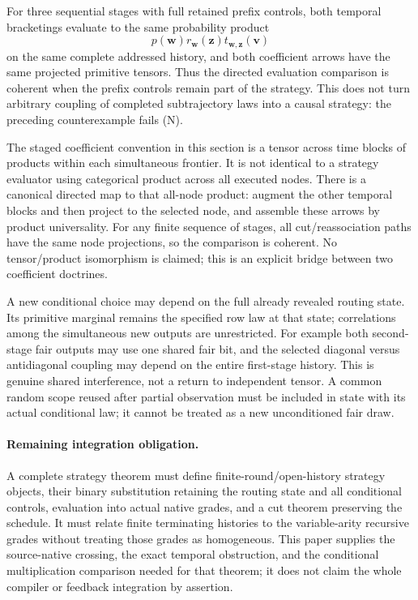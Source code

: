 \documentclass[11pt]{article}
\begin{document}
For three sequential stages with full retained prefix controls, both temporal bracketings evaluate to the same probability product
\[
 p(\mathbf w)r_{\mathbf w}(\mathbf z)t_{\mathbf w,\mathbf z}(\mathbf v)
\]
on the same complete addressed history, and both coefficient arrows have the same projected primitive tensors. Thus the directed evaluation comparison is coherent when the prefix controls remain part of the strategy. This does not turn arbitrary coupling of completed subtrajectory laws into a causal strategy: the preceding counterexample fails (N).

The staged coefficient convention in this section is a tensor across time blocks of products within each simultaneous frontier. It is not identical to a strategy evaluator using categorical product across all executed nodes. There is a canonical directed map to that all-node product: augment the other temporal blocks and then project to the selected node, and assemble these arrows by product universality. For any finite sequence of stages, all cut/reassociation paths have the same node projections, so the comparison is coherent. No tensor/product isomorphism is claimed; this is an explicit bridge between two coefficient doctrines.

A new conditional choice may depend on the full already revealed routing state. Its primitive marginal remains the specified row law at that state; correlations among the simultaneous new outputs are unrestricted. For example both second-stage fair outputs may use one shared fair bit, and the selected diagonal versus antidiagonal coupling may depend on the entire first-stage history. This is genuine shared interference, not a return to independent tensor. A common random scope reused after partial observation must be included in state with its actual conditional law; it cannot be treated as a new unconditioned fair draw.

\paragraph{Remaining integration obligation.} A complete strategy theorem must define finite-round/open-history strategy objects, their binary substitution retaining the routing state and all conditional controls, evaluation into actual native grades, and a cut theorem preserving the schedule. It must relate finite terminating histories to the variable-arity recursive grades without treating those grades as homogeneous. This paper supplies the source-native crossing, the exact temporal obstruction, and the conditional multiplication comparison needed for that theorem; it does not claim the whole compiler or feedback integration by assertion.
\end{document}
